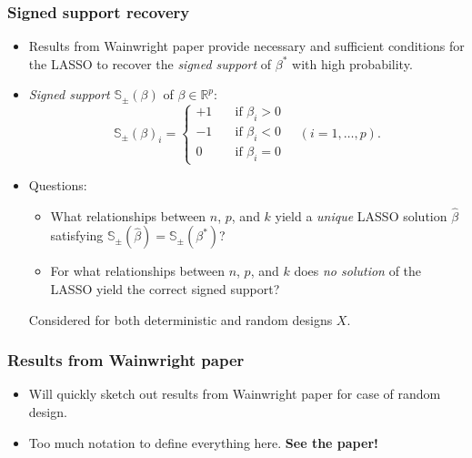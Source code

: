 \documentclass{beamer}
\begin{document}
\begin{frame}
\frametitle{Signed support recovery}

\begin{itemize}
\item Results from Wainwright paper provide necessary and sufficient
  conditions for the LASSO to recover the \textit{signed support} of
  $\beta^\ast$ with high probability.
\item \textit{Signed support} $\mathbb{S}_\pm(\beta)$ of
  $\beta \in \mathbb{R}^p$:
\begin{equation*}
  \mathbb{S}_\pm(\beta)_i =
  \begin{cases}
    +1 & \quad \text{if $\beta_i > 0$} \\
    -1 & \quad \text{if $\beta_i < 0$} \\
    0 & \quad \text{if $\beta_i = 0$}
  \end{cases}
  \quad (i = 1, \ldots, p).
\end{equation*}
\item Questions:
  \begin{itemize}
  \item What relationships between $n$, $p$, and $k$ yield a
    \emph{unique} LASSO solution $\hat{\beta}$ satisfying
    $\mathbb{S}_\pm(\hat{\beta}) = \mathbb{S}_\pm(\beta^\ast)$?
  \item For what relationships between $n$, $p$, and $k$ does \emph{no
      solution} of the LASSO yield the correct signed support?
  \end{itemize}
Considered for both deterministic and random designs $X$.

\end{itemize}

\end{frame}

\begin{frame}
\frametitle{Results from Wainwright paper}

\begin{itemize}
\item Will quickly sketch out results from Wainwright paper for case
  of random design.
\item Too much notation to define everything here. \textbf{See the
    paper!}
\end{itemize}

\end{frame}
\end{document}
